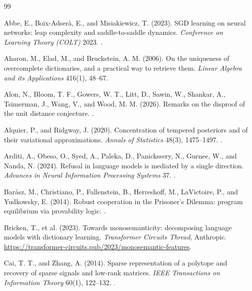 \begin{thebibliography}{99}


 Abbe, E., Boix-Adser\`a, E., and Misiakiewicz, T. (2023). SGD learning on neural networks: leap complexity and saddle-to-saddle dynamics. \emph{Conference on Learning Theory (COLT)} 2023. .

 Aharon, M., Elad, M., and Bruckstein, A. M. (2006). On the uniqueness of overcomplete dictionaries, and a practical way to retrieve them. \emph{Linear Algebra and its Applications} 416(1), 48--67.

 Alon, N., Bloom, T. F., Gowers, W. T., Litt, D., Sawin, W., Shankar, A., Tsimerman, J., Wang, V., and Wood, M. M. (2026). Remarks on the disproof of the unit distance conjecture. .

 Alquier, P., and Ridgway, J. (2020). Concentration of tempered posteriors and of their variational approximations. \emph{Annals of Statistics} 48(3), 1475--1497. .

 Arditi, A., Obeso, O., Syed, A., Paleka, D., Panickssery, N., Gurnee, W., and Nanda, N. (2024). Refusal in language models is mediated by a single direction. \emph{Advances in Neural Information Processing Systems} 37. .


 Bar\'asz, M., Christiano, P., Fallenstein, B., Herreshoff, M., LaVictoire, P., and Yudkowsky, E. (2014). Robust cooperation in the Prisoner's Dilemma: program equilibrium via provability logic. .


 Bricken, T., et al. (2023). Towards monosemanticity: decomposing language models with dictionary learning. \emph{Transformer Circuits Thread}, Anthropic. \url{https://transformer-circuits.pub/2023/monosemantic-features}.



 Cai, T. T., and Zhang, A. (2014). Sparse representation of a polytope and recovery of sparse signals and low-rank matrices. \emph{IEEE Transactions on Information Theory} 60(1), 122--132. .


\end{thebibliography}
